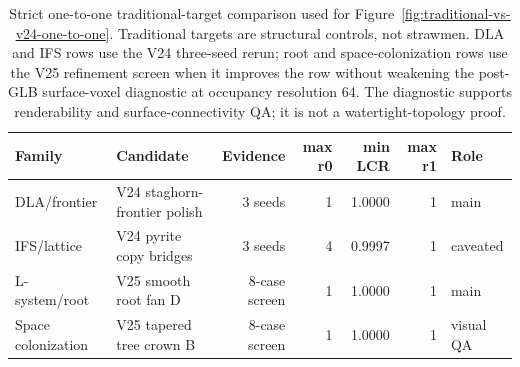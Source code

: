 \begin{table}[t]
  \centering
  \caption{Strict one-to-one traditional-target comparison used for Figure~\ref{fig:traditional-vs-v24-one-to-one}. Traditional targets are structural controls, not strawmen. DLA and IFS rows use the V24 three-seed rerun; root and space-colonization rows use the V25 refinement screen when it improves the row without weakening the post-GLB surface-voxel diagnostic at occupancy resolution 64. The diagnostic supports renderability and surface-connectivity QA; it is not a watertight-topology proof.}
  \label{tab:traditional-v24-one-to-one-summary}
  \begin{tabular}{llrrrrl}
    \toprule
    Family & Candidate & Evidence & max r0 & min LCR & max r1 & Role \\
    \midrule
    DLA/frontier & V24 staghorn-frontier polish & 3 seeds & 1 & 1.0000 & 1 & main \\
    IFS/lattice & V24 pyrite copy bridges & 3 seeds & 4 & 0.9997 & 1 & caveated \\
    L-system/root & V25 smooth root fan D & 8-case screen & 1 & 1.0000 & 1 & main \\
    Space colonization & V25 tapered tree crown B & 8-case screen & 1 & 1.0000 & 1 & visual QA \\
    \bottomrule
  \end{tabular}
\end{table}
